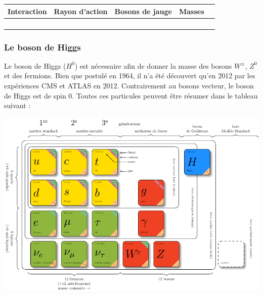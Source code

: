 \vspace{1cm}
\begin{table}[ht!]
	\centering
	\begin{tabular}{|O|O|O|O|N}
		\hline 
		Interaction&Rayon d'action&Bosons de jauge&Masses\\
		\hline 
		&
		& 
		&
		\\
		\hline 
		&
		\shortstack{ $\infty$}& 
		&
		\\
		\hline 
		&
		& 
		&
		\\
		\hline 
		&
		\shortstack{$\infty$}& 
		&
		\\
		\hline 
\end{tabular} 
\label{bosons}
\end{table}

\subsubsection{Le boson de Higgs}
Le boson de Higgs ($H^{0}$) est nécessaire afin de donner la masse des bosons $W^{\pm}$, $Z^{0}$ et des fermions. Bien que postulé en \num{1964}, il n'a été découvert qu'en \num{2012} par les expériences CMS et ATLAS en \num{2012}. Contrairement au bosons vecteur, le boson de Higgs est de spin \num{0}.
\newpage
Toutes ces particules peuvent être résumer dans le tableau suivant : 

\begin{minipagewithmarginpars}[h]{\textwidth}
	\vspace{-0.5cm}
	\centering
	\hspace*{-1.5cm}
	\includegraphics[scale=1]{SM/bestiaire.pdf}
	\label{bestiaire}
\end{minipagewithmarginpars}
